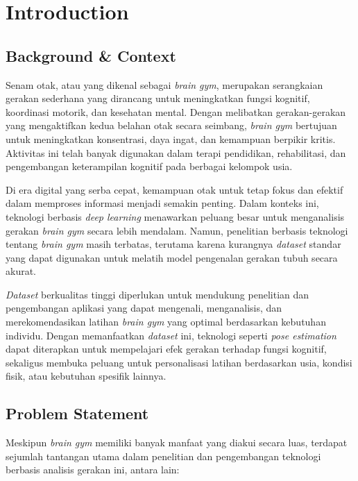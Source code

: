 \documentclass[12pt,a4paper]{article}
\begin{document}
\tableofcontents
\newpage


\section{Introduction}

\subsection{Background \& Context}

Senam otak, atau yang dikenal sebagai \textit{brain gym}, merupakan serangkaian gerakan sederhana yang dirancang untuk meningkatkan fungsi kognitif, koordinasi motorik, dan kesehatan mental. Dengan melibatkan gerakan-gerakan yang mengaktifkan kedua belahan otak secara seimbang, \textit{brain gym} bertujuan untuk meningkatkan konsentrasi, daya ingat, dan kemampuan berpikir kritis. Aktivitas ini telah banyak digunakan dalam terapi pendidikan, rehabilitasi, dan pengembangan keterampilan kognitif pada berbagai kelompok usia.

Di era digital yang serba cepat, kemampuan otak untuk tetap fokus dan efektif dalam memproses informasi menjadi semakin penting. Dalam konteks ini, teknologi berbasis \textit{deep learning} menawarkan peluang besar untuk menganalisis gerakan \textit{brain gym} secara lebih mendalam. Namun, penelitian berbasis teknologi tentang \textit{brain gym} masih terbatas, terutama karena kurangnya \textit{dataset} standar yang dapat digunakan untuk melatih model pengenalan gerakan tubuh secara akurat.

\textit{Dataset} berkualitas tinggi diperlukan untuk mendukung penelitian dan pengembangan aplikasi yang dapat mengenali, menganalisis, dan merekomendasikan latihan \textit{brain gym} yang optimal berdasarkan kebutuhan individu. Dengan memanfaatkan \textit{dataset} ini, teknologi seperti \textit{pose estimation} dapat diterapkan untuk mempelajari efek gerakan terhadap fungsi kognitif, sekaligus membuka peluang untuk personalisasi latihan berdasarkan usia, kondisi fisik, atau kebutuhan spesifik lainnya.

\subsection{Problem Statement}
Meskipun \textit{brain gym} memiliki banyak manfaat yang diakui secara luas, terdapat sejumlah tantangan utama dalam penelitian dan pengembangan teknologi berbasis analisis gerakan ini, antara lain:
\end{document}
